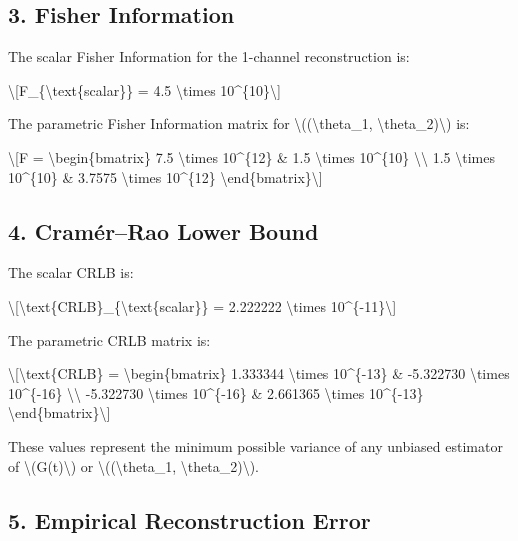 \documentclass[
  10pt,
]{article}
\begin{document}
\hypertarget{fisher-information}{%
\subsection{3. Fisher Information}\label{fisher-information}}

The scalar Fisher Information for the 1-channel reconstruction is:

\textbackslash{[}F\_\{\textbackslash text\{scalar\}\} = 4.5
\textbackslash times 10\^{}\{10\}\textbackslash{]}

The parametric Fisher Information matrix for
\textbackslash((\textbackslash theta\_1,
\textbackslash theta\_2)\textbackslash) is:

\textbackslash{[}F = \textbackslash begin\{bmatrix\} 7.5
\textbackslash times 10\^{}\{12\} \& 1.5 \textbackslash times
10\^{}\{10\} \textbackslash\textbackslash{} 1.5 \textbackslash times
10\^{}\{10\} \& 3.7575 \textbackslash times 10\^{}\{12\}
\textbackslash end\{bmatrix\}\textbackslash{]}

\hypertarget{cramuxe9rrao-lower-bound}{%
\subsection{4. Cramér--Rao Lower Bound}\label{cramuxe9rrao-lower-bound}}

The scalar CRLB is:

\textbackslash{[}\textbackslash text\{CRLB\}\_\{\textbackslash text\{scalar\}\}
= 2.222222 \textbackslash times 10\^{}\{-11\}\textbackslash{]}

The parametric CRLB matrix is:

\textbackslash{[}\textbackslash text\{CRLB\} =
\textbackslash begin\{bmatrix\} 1.333344 \textbackslash times
10\^{}\{-13\} \& -5.322730 \textbackslash times 10\^{}\{-16\}
\textbackslash\textbackslash{} -5.322730 \textbackslash times
10\^{}\{-16\} \& 2.661365 \textbackslash times 10\^{}\{-13\}
\textbackslash end\{bmatrix\}\textbackslash{]}

These values represent the minimum possible variance of any unbiased
estimator of \textbackslash(G(t)\textbackslash) or
\textbackslash((\textbackslash theta\_1,
\textbackslash theta\_2)\textbackslash).

\hypertarget{empirical-reconstruction-error}{%
\subsection{5. Empirical Reconstruction
Error}\label{empirical-reconstruction-error}}
\end{document}

